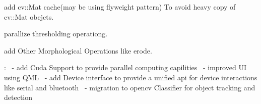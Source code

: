 
\begin{DoxyRefList}
\item[\label{todo__todo000001}%
\Hypertarget{todo__todo000001}%
Class \hyperlink{class_image_processor_1_1_abstract_image_processor}{Image\+Processor\+:\+:Abstract\+Image\+Processor} ]add cv\+::\+Mat cache(may be using flyweight pattern) To avoid heavy copy of cv\+::\+Mat obejcts.  
\item[\label{todo__todo000002}%
\Hypertarget{todo__todo000002}%
Member \hyperlink{class_image_processor_1_1_detect_color_a2097eb7955a1f87fa5aa21944197fa17}{Image\+Processor\+:\+:Detect\+Color\+:\+:detect\+Color} ()]parallize thresholding operationg.  
\item[\label{todo__todo000003}%
\Hypertarget{todo__todo000003}%
Class \hyperlink{class_image_processor_1_1_dilate}{Image\+Processor\+:\+:Dilate} ]add Other Morphological Operations like erode.  
\item[\label{todo__todo000004}%
\Hypertarget{todo__todo000004}%
page \hyperlink{index}{Main Page} ]\+: ~-\/ add Cuda Support to provide parallel computing capilities ~-\/ improved UI using Q\+ML ~-\/ add Device interface to provide a unified api for device interactions like serial and bluetooth ~-\/ migration to opencv Classifier for object tracking and detection 
\end{DoxyRefList}